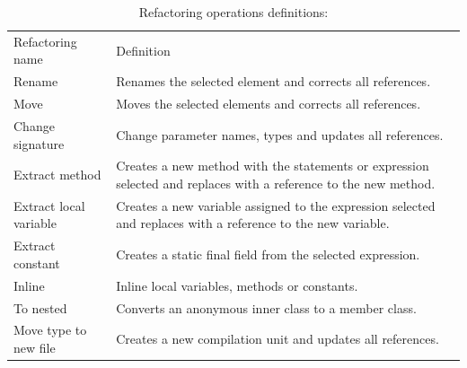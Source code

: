 \begin{table}[htbp]
\caption{Refactoring operations definitions:}
\label{tab-Refactoring-Definitions}
\begin{tabular}{ p{2.95cm}| p{9.15cm}}
\hline\noalign{\smallskip}
Refactoring name 		  & Definition \\
\noalign{\smallskip}
\hline
\noalign{\smallskip}
Rename                    & Renames the selected element and corrects all references.                                                                                                                 \\ \hline
Move                      & Moves the selected elements and corrects all references.                                                                                                                  \\ \hline
Change signature          & Change parameter names, types and updates all references.                                                                                                                 \\ \hline
Extract method            & Creates a new method with the statements or expression selected and replaces with a reference to the new method.                                                          \\ \hline
Extract local variable    & Creates a new variable assigned to the expression selected and replaces with a reference to the new variable.                                                             \\ \hline
Extract constant          & Creates a static final field from the selected expression.                                                                                                                \\ \hline
Inline                    & Inline local variables, methods or constants.                                                                                                                             \\ \hline
To nested                 & Converts an anonymous inner class to a member class.                                                                                                                      \\ \hline
Move type to new file     & Creates a new compilation unit and updates all references.                                                                                                                \\ \hline

\end{tabular}
\end{table}

